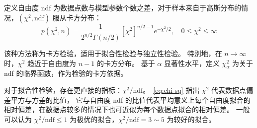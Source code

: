 定义自由度 ndf 为数据点数与模型参数个数之差，对于样本来自于高斯分布的情况，$(\chi^2,\text{ndf})$ 服从卡方分布：
\begin{equation}
    p(\chi^{2},n)=\frac{1}{2^{n/2} \Gamma(n/2)}[\chi^{2}]^{n/2-1}e^{-\chi^{2}/2},\quad0\leq\chi^{2}\leq\infty 
    \label{eq:chi-distribution}
\end{equation}

该种方法称为卡方检验，适用于拟合性检验与独立性检验。
特别地，在 $n\rightarrow\infty$ 时，$\chi^2$ 趋近于自由度为 $n-1$ 的卡方分布。
基于 $\alpha$ 显著性水平，定义 $\chi_\alpha^2$ 为关于 ndf 的临界函数，作为检验的卡方依据。

对于拟合性检验，存在更直接的指标：$\chi^2/\text{ndf}$。~\eqref{eq:chi-sq} 指出 $\chi^2$ 代表数据点偏差平方与方差的比值，
它与自由度 ndf 的比值代表平均意义上每个自由度拟合的相对偏差，在数据点较多的情况下也可近似为每个数据点拟合的相对偏差。
一般可以认为 $\chi^2/\text{ndf}\le1$ 为极优的拟合，$\chi^2/\text{ndf}=3\sim5$ 为较好的拟合。
